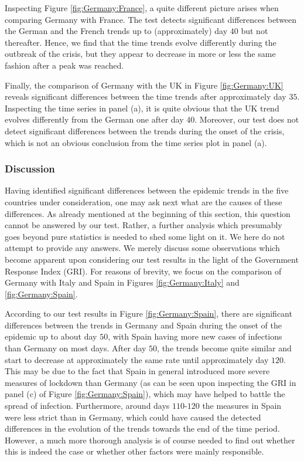 \documentclass[a4paper,12pt]{article}
\numberwithin{equation}{section}
\begin{document}
Inspecting Figure \ref{fig:Germany:France}, a quite different picture arises when comparing Germany with France. The test detects significant differences between the German and the French trends up to (approximately) day $40$ but not thereafter. Hence, we find that the time trends evolve differently during the outbreak of the crisis, but they appear to decrease in more or less the same fashion after a peak was reached. 

Finally, the comparison of Germany with the UK in Figure \ref{fig:Germany:UK} reveals significant differences between the time trends after approximately day $35$. Inspecting the time series in panel (a), it is quite obvious that the UK trend evolves differently from the German one after day $40$. Moreover, our test does not detect significant differences between the trends during the onset of the crisis, which is not an obvious conclusion from the time series plot in panel (a).


\subsubsection{Discussion}


Having identified significant differences between the epidemic trends in the five countries under consideration, one may ask next what are the causes of these differences. As already mentioned at the beginning of this section, this question cannot be answered by our test. Rather, a further analysis which presumably goes beyond pure statistics is needed to shed some light on it. We here do not attempt to provide any answers. We merely discuss some observations which become apparent upon considering our test results in the light of the Government Response Index (GRI). For reasons of brevity, we focus on the comparison of Germany with Italy and Spain in Figures \ref{fig:Germany:Italy} and \ref{fig:Germany:Spain}. 


According to our test results in Figure \ref{fig:Germany:Spain}, there are significant differences between the trends in Germany and Spain during the onset of the epidemic up to about day $50$, with Spain having more new cases of infections than Germany on most days. After day $50$, the trends become quite similar and start to decrease at approximately the same rate until approximately day $120$. This may be due to the fact that Spain in general introduced more severe measures of lockdown than Germany (as can be seen upon inspecting the GRI in panel (c) of Figure \ref{fig:Germany:Spain}), which may have helped to battle the spread of infection. Furthermore, around days $110$-$120$ the measures in Spain were less strict than in Germany, which could have caused the detected differences in the evolution of the trends towards the end of the time period. However, a much more thorough analysis is of course needed to find out whether this is indeed the case or whether other factors were mainly responsible. 
\end{document}
